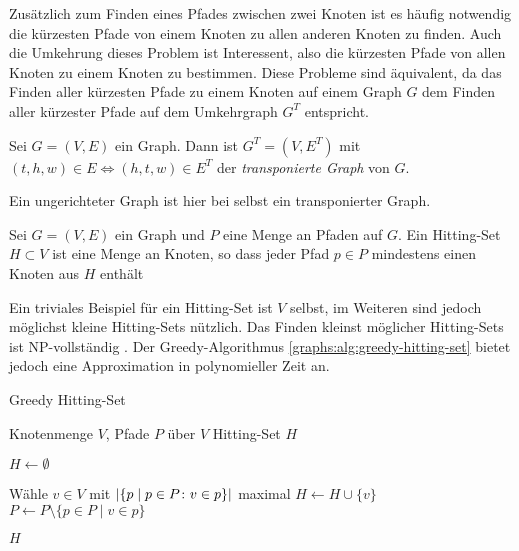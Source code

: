 Zusätzlich zum Finden eines Pfades zwischen zwei Knoten ist es häufig notwendig die kürzesten Pfade von einem Knoten zu allen anderen Knoten zu finden.
Auch die Umkehrung dieses Problem ist Interessent, also die kürzesten Pfade von allen Knoten zu einem Knoten zu bestimmen.
Diese Probleme sind äquivalent, da das Finden aller kürzesten Pfade zu einem Knoten auf einem Graph $G$ dem Finden aller kürzester Pfade auf dem Umkehrgraph $G^T$ entspricht.

\begin{definition}
    Sei $G = (V, E)$ ein Graph. Dann ist $G^T = (V, E^T)$ mit $(t, h, w) \in E \Leftrightarrow (h, t, w) \in E^T$ der \emph{transponierte Graph} von $G$.
\end{definition}

Ein ungerichteter Graph ist hier bei selbst ein transponierter Graph.

\begin{definition}
    Sei $G = (V, E)$ ein Graph und $P$ eine Menge an Pfaden auf $G$.
    Ein Hitting-Set $H \subset V$ ist eine Menge an Knoten, so dass jeder Pfad $p \in P$ mindestens einen Knoten aus $H$ enthält
\end{definition}

Ein triviales Beispiel für ein Hitting-Set ist $V$ selbst, im Weiteren sind jedoch möglichst kleine Hitting-Sets nützlich.
Das Finden kleinst möglicher Hitting-Sets ist NP-vollständig \cite{Kar72}.
Der Greedy-Algorithmus \ref{graphs:alg:greedy-hitting-set} bietet jedoch eine Approximation in polynomieller Zeit an.

\begin{algorithm}
    \caption{Greedy Hitting-Set}
    \begin{algorithmic}[1]
        \Require Knotenmenge $V$, Pfade $P$ über $V$
        \Ensure Hitting-Set $H$

        \State $H \gets \emptyset$

        \State

        \State Wähle $v \in V$ mit $\abs{ \{ p \mid p \in P \colon v \in p \}}$ maximal
        \State $H \gets H \cup \{  v \}$
        \State $P \gets P \setminus \{p \in P \mid v \in p\}$
        \EndWhile

        \State

        \State \Return $H$
    \end{algorithmic}
    \label{graphs:alg:greedy-hitting-set}
\end{algorithm}


